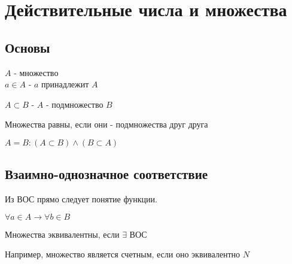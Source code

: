 \section{Действительные числа и множества}

\subsection{Основы}
$A$ - множество \\

$ a \in A$ - $a$ принадлежит $A$

$ A \subset B $ - $A$ - подмножество $B$

Множества равны, если они - подмножества друг друга

$A = B: (A \subset B) \wedge (B \subset A)$

\subsection{Взаимно-однозначное соответствие}

Из ВОС прямо следует понятие функции.


$ \forall a \in A \longrightarrow \forall b \in B $

Множества эквивалентны, если $\exists$ ВОС

Например, множество является счетным, если оно эквивалентно $N$


